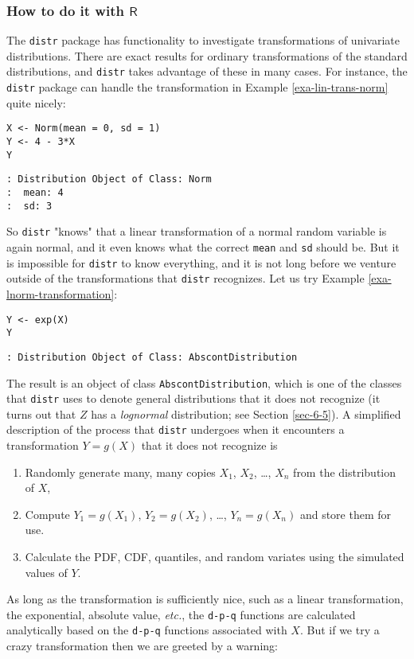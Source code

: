\subsubsection{How to do it with \(\mathsf{R}\)}
\label{sec-6-4-2-1}

The \texttt{distr} package \cite{distr} has functionality to investigate
transformations of univariate distributions. There are exact results
for ordinary transformations of the standard distributions, and
\texttt{distr} takes advantage of these in many cases. For instance, the
\texttt{distr} package can handle the transformation in Example \ref{exa-lin-trans-norm} quite nicely:

\begin{verbatim}
X <- Norm(mean = 0, sd = 1)
Y <- 4 - 3*X
Y
\end{verbatim}

\begin{verbatim}
: Distribution Object of Class: Norm
:  mean: 4
:  sd: 3
\end{verbatim}

So \texttt{distr} "knows" that a linear transformation of a normal random
variable is again normal, and it even knows what the correct \texttt{mean}
and \texttt{sd} should be. But it is impossible for \texttt{distr} to know
everything, and it is not long before we venture outside of the
transformations that \texttt{distr} recognizes. Let us try Example
\ref{exa-lnorm-transformation}:

\begin{verbatim}
Y <- exp(X)
Y
\end{verbatim}

\begin{verbatim}
: Distribution Object of Class: AbscontDistribution
\end{verbatim}

The result is an object of class \texttt{AbscontDistribution}, which is one
of the classes that \texttt{distr} uses to denote general distributions that
it does not recognize (it turns out that \(Z\) has a \emph{lognormal}
distribution; see Section \ref{sec-6-5}). A
simplified description of the process that \texttt{distr} undergoes when it
encounters a transformation \(Y=g(X)\) that it does not recognize is
\begin{enumerate}
\item Randomly generate many, many copies \(X_{1}\), \(X_{2}\), \ldots{},
\(X_{n}\) from the distribution of \(X\),
\item Compute \(Y_{1}=g(X_{1})\), \(Y_{2}=g(X_{2})\), \ldots{},
\(Y_{n}=g(X_{n})\) and store them for use.
\item Calculate the PDF, CDF, quantiles, and random variates using the
simulated values of \(Y\).
\end{enumerate}
As long as the transformation is sufficiently nice, such as a linear
transformation, the exponential, absolute value, \emph{etc.}, the \texttt{d-p-q}
functions are calculated analytically based on the \texttt{d-p-q} functions
associated with \(X\). But if we try a crazy transformation then we
are greeted by a warning:

